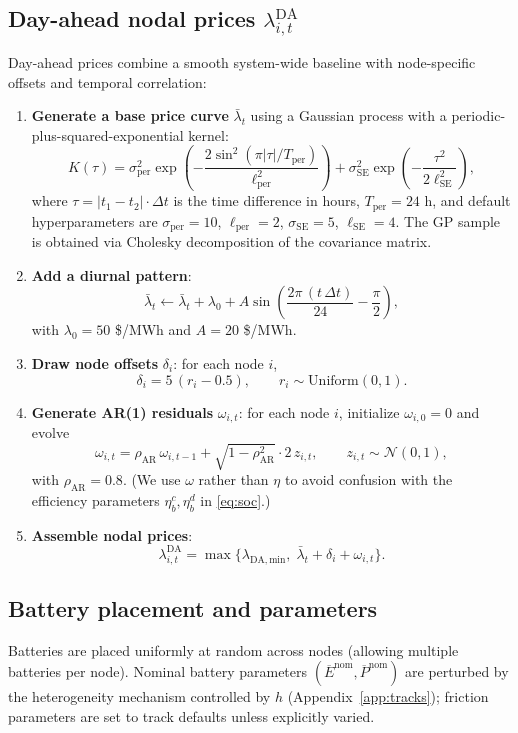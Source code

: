\documentclass[11pt]{article}
\begin{document}
\subsection{Day-ahead nodal prices $\lambda^{\mathrm{DA}}_{i,t}$}
Day-ahead prices combine a smooth system-wide baseline with node-specific offsets and temporal correlation:
\begin{enumerate}
\item \textbf{Generate a base price curve} $\bar{\lambda}_t$ using a Gaussian process with a periodic-plus-squared-exponential kernel:
\[
K(\tau) = \sigma_{\mathrm{per}}^2\exp\!\left(-\frac{2\sin^2(\pi|\tau|/T_{\mathrm{per}})}{\ell_{\mathrm{per}}^2}\right) + \sigma_{\mathrm{SE}}^2\exp\!\left(-\frac{\tau^2}{2\ell_{\mathrm{SE}}^2}\right),
\]
where $\tau=|t_1-t_2|\cdot\Delta t$ is the time difference in hours, $T_{\mathrm{per}}=24$ h, and default hyperparameters are $\sigma_{\mathrm{per}}=10$, $\ell_{\mathrm{per}}=2$, $\sigma_{\mathrm{SE}}=5$, $\ell_{\mathrm{SE}}=4$. The GP sample is obtained via Cholesky decomposition of the covariance matrix.
\item \textbf{Add a diurnal pattern}:
\[
\bar{\lambda}_t \leftarrow \bar{\lambda}_t + \lambda_0 + A\sin\!\left(\frac{2\pi\,(t\,\Delta t)}{24}-\frac{\pi}{2}\right),
\]
with $\lambda_0=50$ \$/MWh and $A=20$ \$/MWh.
\item \textbf{Draw node offsets} $\delta_i$: for each node $i$,
\[
\delta_i = 5\,(r_i - 0.5), \qquad r_i\sim\mathrm{Uniform}(0,1).
\]
\item \textbf{Generate AR(1) residuals} $\omega_{i,t}$: for each node $i$, initialize $\omega_{i,0}=0$ and evolve
\[
\omega_{i,t} = \rho_{\mathrm{AR}}\,\omega_{i,t-1} + \sqrt{1-\rho_{\mathrm{AR}}^2}\cdot 2\,z_{i,t}, \qquad z_{i,t}\sim\mathcal{N}(0,1),
\]
with $\rho_{\mathrm{AR}}=0.8$. (We use $\omega$ rather than $\eta$ to avoid confusion with the efficiency parameters $\eta^c_b,\eta^d_b$ in \eqref{eq:soc}.)
\item \textbf{Assemble nodal prices}:
\[
\lambda^{\mathrm{DA}}_{i,t} = \max\bigl\{\lambda_{\mathrm{DA,min}},\;\bar{\lambda}_t + \delta_i + \omega_{i,t}\bigr\}.
\]
\end{enumerate}

\subsection{Battery placement and parameters}
Batteries are placed uniformly at random across nodes (allowing multiple batteries per node). Nominal battery parameters $(\overline{E}^{\mathrm{nom}},\overline{P}^{\mathrm{nom}})$ are perturbed by the heterogeneity mechanism controlled by $h$ (Appendix~\ref{app:tracks}); friction parameters are set to track defaults unless explicitly varied.
\end{document}
